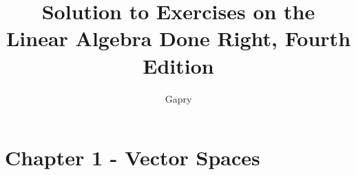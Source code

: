 \documentclass{article}
\title{Solution to Exercises on the \\Linear Algebra Done Right, Fourth Edition}
\author{Gapry}
\begin{document}
\maketitle

\section*{Chapter 1 - Vector Spaces}
\end{document}
